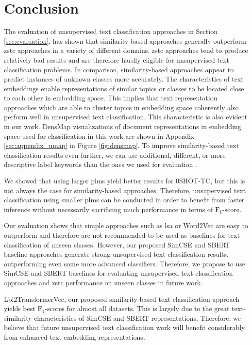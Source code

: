 \documentclass[sigconf]{acmart}
\begin{document}
\section{Conclusion}
The evaluation of unsupervised text classification approaches in Section \ref{sec:evaluation}, has shown that similarity-based approaches generally outperform \ac{zstc} approaches in a variety of different domains. \ac{zstc} approaches tend to produce relatively bad results and are therefore hardly eligible for unsupervised text classification problems. In comparison, similarity-based approaches appear to predict instances of unknown classes more accurately. The characteristics of text embeddings enable representations of similar topics or classes to be located close to each other in embedding space. This implies that text representation approaches which are able to cluster topics in embedding space coherently also perform well in unsupervised text classification. This characteristic is also evident in our work. DensMap \cite{Narayan2020DensityPreservingDV} visualizations of document representations in embedding space used for classification in this work are shown in Appendix \ref{sec:appendix_umap} in Figure \ref{fig:densmap}. To improve similarity-based text classification results even further, we can use additional, different, or more descriptive label keywords than the ones we used for evaluation \cite{haj-yahia-etal-2019-towards, webist21}. 


We showed that using larger \acp{plm} yield better results for 0SHOT-TC, but this is not always the case for similarity-based approaches. Therefore, unsupervised text classification using smaller \acp{plm} can be conducted in order to benefit from faster inference without necessarily sacrificing much performance in terms of $\text{F}_{1}\text{-score}$.

Our evaluation shows that simple approaches such as \ac{lsa} or Word2Vec are easy to outperform and therefore are not recommended to be used as baselines for text classification of unseen classes. However, our proposed SimCSE and SBERT baseline approaches generate strong unsupervised text classification results, outperforming even some more advanced classifiers. Therefore, we propose to use SimCSE and SBERT baselines for evaluating unsupervised text classification approaches and \ac{zstc} performance on unseen classes in future work. 

Lbl2TransformerVec, our proposed similarity-based text classification approach yields best $\text{F}_{1}\text{-scores}$ for almost all datasets. This is largely due to the great text-similarity characteristics of SimCSE and SBERT representations. Therefore, we believe that future unsupervised text classification work will benefit considerably from enhanced text embedding representations. 
\end{document}
